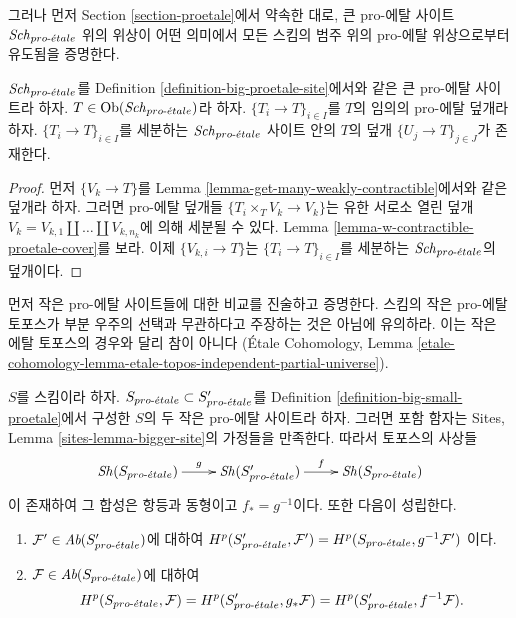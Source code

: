\medskip\noindent
그러나 먼저 Section \ref{section-proetale}에서 약속한 대로, 큰
pro-에탈 사이트 $\mathit{Sch}_{pro\text{-}\acute{e}tale}$ 위의 위상이 어떤 의미에서 모든
스킴의 범주 위의 pro-에탈 위상으로부터 유도됨을 증명한다.

\begin{lemma}
\label{lemma-proetale-induced}
$\mathit{Sch}_{pro\text{-}\acute{e}tale}$를 Definition \ref{definition-big-proetale-site}에서와
같은 큰 pro-에탈 사이트라 하자. $T \in \mathop{\mathrm{Ob}}\nolimits(\mathit{Sch}_{pro\text{-}\acute{e}tale})$라 하자.
$\{T_i \to T\}_{i \in I}$를 $T$의 임의의 pro-에탈 덮개라 하자.
$\{T_i \to T\}_{i \in I}$를 세분하는 $\mathit{Sch}_{pro\text{-}\acute{e}tale}$ 사이트 안의
$T$의 덮개 $\{U_j \to T\}_{j \in J}$가 존재한다.
\end{lemma}

\begin{proof}
먼저 $\{V_k \to T\}$를 Lemma
\ref{lemma-get-many-weakly-contractible}에서와 같은 덮개라 하자.
그러면 pro-에탈 덮개들 $\{T_i \times_T V_k \to V_k\}$는 유한 서로소
열린 덮개 $V_k = V_{k, 1} \amalg \ldots \amalg V_{k, n_k}$에 의해
세분될 수 있다. Lemma \ref{lemma-w-contractible-proetale-cover}를 보라.
이제 $\{V_{k, i} \to T\}$는 $\{T_i \to T\}_{i \in I}$를 세분하는
$\mathit{Sch}_{pro\text{-}\acute{e}tale}$의 덮개이다.
\end{proof}

\noindent
먼저 작은 pro-에탈 사이트들에 대한 비교를 진술하고 증명한다. 스킴의
작은 pro-에탈 토포스가 부분 우주의 선택과 무관하다고 주장하는 것은
아님에 유의하라. 이는 작은 에탈 토포스의 경우와 달리 참이 아니다
(\'Etale Cohomology, Lemma
\ref{etale-cohomology-lemma-etale-topos-independent-partial-universe}).

\begin{lemma}
\label{lemma-proetale-cohomology-independent-partial-universe}
$S$를 스킴이라 하자. $S_{pro\text{-}\acute{e}tale} \subset S_{pro\text{-}\acute{e}tale}'$를 Definition
\ref{definition-big-small-proetale}에서 구성한 $S$의 두 작은 pro-에탈
사이트라 하자. 그러면 포함 함자는 Sites, Lemma
\ref{sites-lemma-bigger-site}의 가정들을 만족한다. 따라서 토포스의
사상들
$$
\xymatrix{
\Sh(S_\proetale) \ar[r]^g &
\Sh(S_\proetale') \ar[r]^f &
\Sh(S_\proetale)
}
$$
이 존재하여 그 합성은 항등과 동형이고 $f_* = g^{-1}$이다. 또한
다음이 성립한다.
\begin{enumerate}
\item $\mathcal{F}' \in \textit{Ab}(S_{pro\text{-}\acute{e}tale}')$에 대하여
$H^p(S_{pro\text{-}\acute{e}tale}', \mathcal{F}') = H^p(S_{pro\text{-}\acute{e}tale}, g^{-1}\mathcal{F}')$
이다.
\item $\mathcal{F} \in \textit{Ab}(S_{pro\text{-}\acute{e}tale})$에 대하여
$$
H^p(S_{pro\text{-}\acute{e}tale}, \mathcal{F}) =
H^p(S_{pro\text{-}\acute{e}tale}', g_*\mathcal{F}) =
H^p(S_{pro\text{-}\acute{e}tale}', f^{-1}\mathcal{F}).
$$
\end{enumerate}
\end{lemma}

